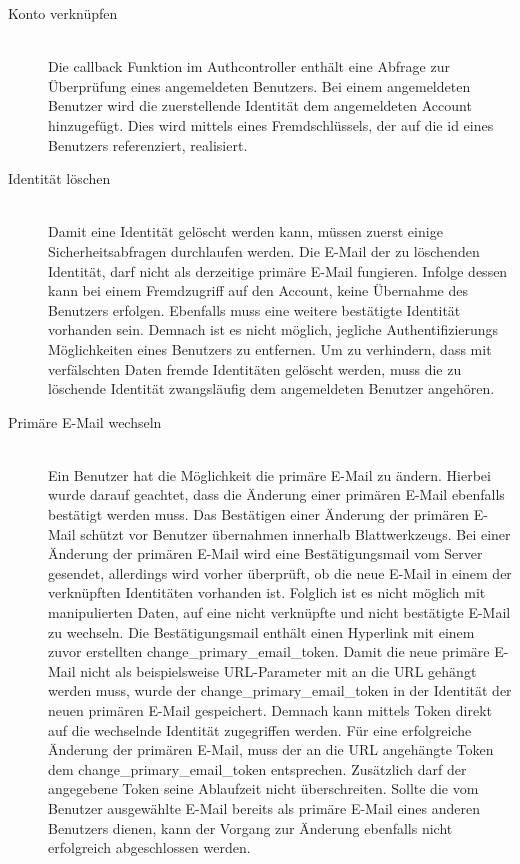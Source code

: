 \begin{description}
	\item[Konto verknüpfen]\hfill\\
	Die callback Funktion im Authcontroller enthält eine Abfrage zur Überprüfung eines angemeldeten Benutzers. Bei einem angemeldeten Benutzer wird die zuerstellende Identität dem angemeldeten Account hinzugefügt. Dies wird mittels eines Fremdschlüssels, der auf die id eines Benutzers referenziert, realisiert.
	\item[Identität löschen]\hfill\\
	Damit eine Identität gelöscht werden kann, müssen zuerst einige Sicherheitsabfragen durchlaufen werden. Die E-Mail der zu löschenden Identität, darf nicht als derzeitige primäre E-Mail fungieren. Infolge dessen kann bei einem Fremdzugriff auf den Account, keine Übernahme des Benutzers erfolgen. Ebenfalls muss eine weitere bestätigte Identität vorhanden sein. Demnach ist es nicht möglich, jegliche Authentifizierungs Möglichkeiten eines Benutzers zu entfernen. Um zu verhindern, dass mit verfälschten Daten fremde Identitäten gelöscht werden, muss die zu löschende Identität zwangsläufig dem angemeldeten Benutzer angehören.
	\item[Primäre E-Mail wechseln]\hfill\\
	Ein Benutzer hat die Möglichkeit die primäre E-Mail zu ändern. Hierbei wurde darauf geachtet, dass die Änderung einer primären E-Mail ebenfalls bestätigt werden muss. Das Bestätigen einer Änderung der primären E-Mail schützt vor Benutzer übernahmen innerhalb Blattwerkzeugs. Bei einer Änderung der primären E-Mail wird eine Bestätigungsmail vom Server gesendet, allerdings wird vorher überprüft, ob die neue E-Mail in einem der verknüpften Identitäten vorhanden ist. Folglich ist es nicht möglich mit manipulierten Daten, auf eine nicht verknüpfte und nicht bestätigte E-Mail zu wechseln. Die Bestätigungsmail enthält einen Hyperlink mit einem zuvor erstellten change\_primary\_email\_token. Damit die neue primäre E-Mail nicht als beispielsweise URL-Parameter mit an die \gls{URL} gehängt werden muss, wurde der change\_primary\_email\_token in der Identität der neuen primären E-Mail gespeichert. Demnach kann mittels Token direkt auf die wechselnde Identität zugegriffen werden. Für eine erfolgreiche Änderung der primären E-Mail, muss der an die \gls{URL} angehängte Token dem change\_primary\_email\_token entsprechen. Zusätzlich darf der angegebene Token seine Ablaufzeit nicht überschreiten. Sollte die vom Benutzer ausgewählte E-Mail bereits als primäre E-Mail eines anderen Benutzers dienen, kann der Vorgang zur Änderung ebenfalls nicht erfolgreich abgeschlossen werden.

\end{description}

